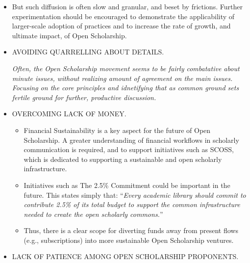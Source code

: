 \documentclass[]{article}
\begin{document}
\begin{itemize}
\item
  But such diffusion is often slow and granular, and beset by frictions.
  Further experimentation should be encouraged to demonstrate the
  applicability of larger-scale adoption of practices and to increase
  the rate of growth, and ultimate impact, of Open Scholarship.
\item
  AVOIDING QUARRELLING ABOUT DETAILS.

  \emph{Often, the Open Scholarship movement seems to be fairly
  combatative about minute issues, without realizing amount of agreement
  on the main issues. Focusing on the core principles and idnetifying
  that as common ground sets fertile ground for further, productive
  discussion.}
\item
  OVERCOMING LACK OF MONEY.

  \begin{itemize}
  \item
    Financial Sustainability is a key aspect for the future of Open
    Scholarship. A greater understanding of financial workflows in
    scholarly communication is required, and to support initiatives such
    as SCOSS, which is dedicated to supporting a sustainable and open
    scholarly infrastructure.
  \item
    Initiatives such as The 2.5\% Commitment could be important in the
    future. This states simply that: ``\emph{Every academic library
    should commit to contribute 2.5\% of its total budget to support the
    common infrastructure needed to create the open scholarly
    commons.}''
  \item
    Thus, there is a clear scope for diverting funds away from present
    flows (e.g., subscriptions) into more sustainable Open Scholarship
    ventures.
  \end{itemize}
\item
  LACK OF PATIENCE AMONG OPEN SCHOLARSHIP PROPONENTS.


\end{itemize}
\end{document}
